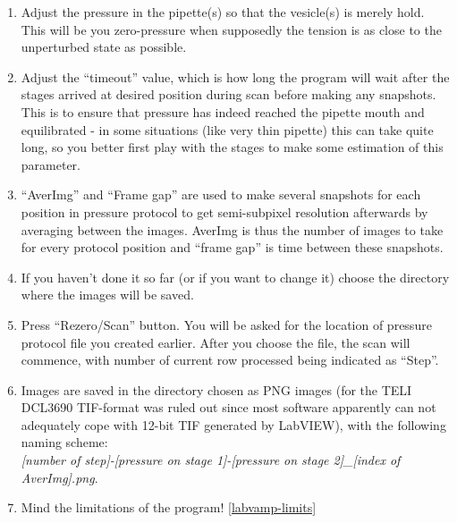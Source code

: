 \begin{enumerate}
\begin{enumerate}
		\item Adjust the pressure in the pipette(s) so that the vesicle(s) is merely hold. This will be you zero-pressure when supposedly the tension is as close to the unperturbed state as possible.
		\item Adjust the ``timeout'' value, which is how long the program will wait after the stages arrived at desired position during scan before making any snapshots. This is to ensure that pressure has indeed reached the pipette mouth and equilibrated - in some situations (like very thin pipette) this can take quite long, so you better first play with the stages to make some estimation of this parameter.
		\item ``AverImg'' and ``Frame gap'' are used to make several snapshots for each position in pressure protocol to get semi-subpixel resolution afterwards by averaging between the images. AverImg is thus the number of images to take for every protocol position and ``frame gap'' is time between these snapshots.
		\item If you haven't done it so far (or if you want to change it) choose the directory where the images will be saved.
		\item Press ``Rezero/Scan'' button. You will be asked for the location of pressure protocol file you created earlier. After you choose the file, the scan will commence, with number of current row processed being indicated as ``Step''.
		\item Images are saved in the directory chosen as PNG images (for the TELI DCL3690 TIF-format was ruled out since most software apparently can not adequately cope with 12-bit TIF generated by LabVIEW), with the following naming scheme:\\ \emph{[number of step]-[pressure on stage 1]-[pressure on stage 2]\_[index of AverImg].png}.
		\item Mind the limitations of the program! \ref{labvamp-limits}
	\end{enumerate}
\end{enumerate}

